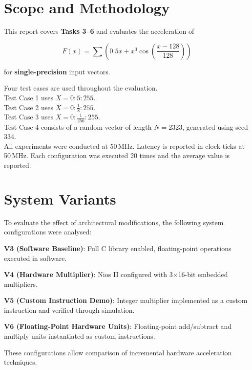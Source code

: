 \section{Scope and Methodology}

This report covers \textbf{Tasks 3--6} and evaluates the acceleration of

\[
F(x)=\sum \left(0.5x + x^3\cos\left(\frac{x-128}{128}\right)\right)
\]

for \textbf{single-precision} input vectors.

Four test cases are used throughout the evaluation.\\
Test Case 1 uses $X = 0:5:255$.\\
Test Case 2 uses $X = 0:\frac{1}{8}:255$.\\
Test Case 3 uses $X = 0:\frac{1}{256}:255$.\\
Test Case 4 consists of a random vector of length $N=2323$, generated using seed 334.\\

All experiments were conducted at 50\,MHz.
Latency is reported in clock ticks at 50\,MHz.
Each configuration was executed 20 times and the average value is reported.

\section{System Variants}

To evaluate the effect of architectural modifications, the following system configurations were analysed:

\textbf{V3 (Software Baseline)}: Full C library enabled, floating-point operations executed in software.

\textbf{V4 (Hardware Multiplier)}: Nios II configured with 3$\times$16-bit embedded multipliers.

\textbf{V5 (Custom Instruction Demo)}: Integer multiplier implemented as a custom instruction and verified through simulation.

\textbf{V6 (Floating-Point Hardware Units)}: Floating-point add/subtract and multiply units instantiated as custom instructions.

These configurations allow comparison of incremental hardware acceleration techniques.

